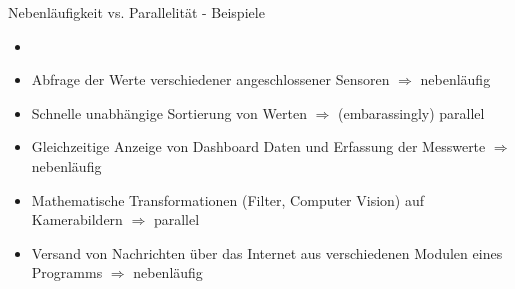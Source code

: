 \begin{frame}{Nebenläufigkeit vs. Parallelität - Beispiele}
        \begin{itemize}
        \setlength{\itemindent}{2.2in}
        \item [\textbf{Beispiele: Nebenläufig oder Parallel?}]
    \end{itemize}

    \begin{itemize}
        \item Abfrage der Werte verschiedener angeschlossener Sensoren $\Rightarrow$ nebenläufig
        \item Schnelle unabhängige Sortierung von Werten $\Rightarrow$ (embarassingly) parallel
        \item Gleichzeitige Anzeige von Dashboard Daten und Erfassung der Messwerte $\Rightarrow$ nebenläufig
        \item Mathematische Transformationen (Filter, Computer Vision) auf Kamerabildern  $\Rightarrow$ parallel %
        \item Versand von Nachrichten über das Internet aus verschiedenen Modulen eines Programms  $\Rightarrow$ nebenläufig
     \end{itemize}
\end{frame}

